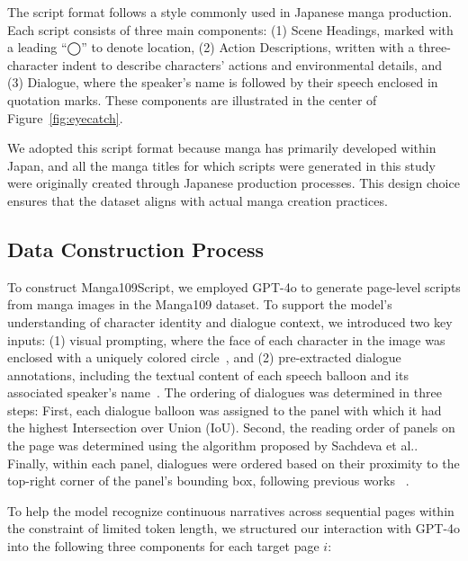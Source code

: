 \documentclass[sigconf, screen, review, anonymous]{acmart}
\begin{document}
The script format follows a style commonly used in Japanese manga production. Each script consists of three main components:
(1) Scene Headings, marked with a leading “◯” to denote location,
(2) Action Descriptions, written with a three-character indent to describe characters’ actions and environmental details, and
(3) Dialogue, where the speaker’s name is followed by their speech enclosed in quotation marks.
These components are illustrated in the center of Figure~\ref{fig:eyecatch}.

We adopted this script format because manga has primarily developed within Japan, and all the manga titles for which scripts were generated in this study were originally created through Japanese production processes. This design choice ensures that the dataset aligns with actual manga creation practices.

\subsection{Data Construction Process}

To construct Manga109Script, we employed GPT-4o to generate page-level scripts from manga images in the Manga109 dataset. To support the model’s understanding of character identity and dialogue context, we introduced two key inputs: (1) visual prompting, where the face of each character in the image was enclosed with a uniquely colored circle~\cite{shtedritski_what_2023}, and (2) pre-extracted dialogue annotations, including the textual content of each speech balloon and its associated speaker's name~\cite{li_manga109dialog_2024}. The ordering of dialogues was determined in three steps: First, each dialogue balloon was assigned to the panel with which it had the highest Intersection over Union (IoU). Second, the reading order of panels on the page was determined using the algorithm proposed by Sachdeva et al.\cite{sachdeva_manga_2024}. Finally, within each panel, dialogues were ordered based on their proximity to the top-right corner of the panel’s bounding box, following previous works~\cite{vivoli_comicap_2024, sachdeva_manga_2024, hinami_towards_2021} .

To help the model recognize continuous narratives across sequential pages within the constraint of limited token length, we structured our interaction with GPT-4o into the following three components for each target page $i$:
\end{document}
